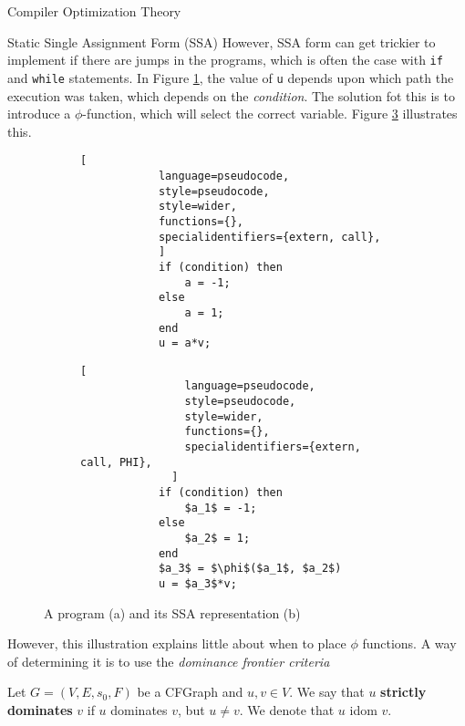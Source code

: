 \begin{section}{Compiler Optimization Theory}
\begin{subsection}{Static Single Assignment Form (SSA)}
However, SSA form can get trickier to implement if there are jumps in the
programs, which is often the case with \texttt{if} and \texttt{while}
statements. In Figure \ref{fig:code_normal}, the value of \texttt{u}
depends upon which path the execution was taken, which depends on the
\textit{condition}. The solution fot this is to introduce a $\phi$-function,
which will select the correct variable. Figure \ref{fig:code_ssa_form}
illustrates this.

\begin{figure}[ht]
    \centering
    \begin{subfigure}[b]{0.40\textwidth}

        \begin{lstlisting}[
            language=pseudocode,
            style=pseudocode,
            style=wider,
            functions={},
            specialidentifiers={extern, call},
            ]
            if (condition) then
                a = -1;
            else
                a = 1;
            end
            u = a*v;
        \end{lstlisting}
        \caption{\label{fig:code_normal}}
    \end{subfigure}
    \begin{subfigure}[b]{0.40\textwidth}
        \begin{lstlisting}[
                language=pseudocode,
                style=pseudocode,
                style=wider,
                functions={},
                specialidentifiers={extern, call, PHI},
              ]
            if (condition) then
                $a_1$ = -1;
            else
                $a_2$ = 1;
            end
            $a_3$ = $\phi$($a_1$, $a_2$)
            u = $a_3$*v;
        \end{lstlisting}
        \caption{\label{fig:code_ssa_form}}
\end{subfigure}
\caption{A program (a) and its SSA representation (b)}
\end{figure}

However, this illustration explains little about when to
place $\phi$ functions. A way of determining it is to use
the \textit{dominance frontier criteria}

\begin{definition}
	Let $G = (V, E, s_0, F)$ be a CFGraph and $u, v \in V$. We say that
	$u$ \textbf{strictly dominates} $v$ if $u$ dominates $v$, but
	$u \neq v$. We denote that $u$ idom $v$.
\end{definition}


\end{subsection}
\end{section}
